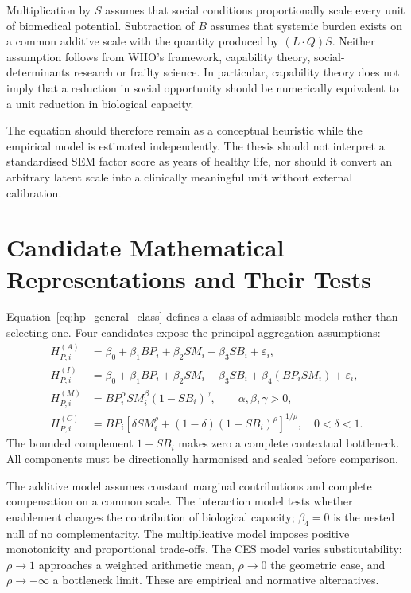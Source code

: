 Multiplication by $S$ assumes that social conditions proportionally scale every unit of biomedical potential. Subtraction of $B$ assumes that systemic burden exists on a common additive scale with the quantity produced by $(L\cdot Q)S$. Neither assumption follows from WHO's framework, capability theory, social-determinants research or frailty science. In particular, capability theory does not imply that a reduction in social opportunity should be numerically equivalent to a unit reduction in biological capacity.

The equation should therefore remain as a conceptual heuristic while the empirical model is estimated independently. The thesis should not interpret a standardised SEM factor score as years of healthy life, nor should it convert an arbitrary latent scale into a clinically meaningful unit without external calibration.

\section{Candidate Mathematical Representations and Their Tests}

Equation~\ref{eq:hp_general_class} defines a class of admissible models rather
than selecting one. Four candidates expose the principal aggregation assumptions:
\begin{align}
H_{P,i}^{(A)}&=\beta_0+\beta_1BP_i+\beta_2SM_i-\beta_3SB_i+\varepsilon_i,
\label{eq:hp_additive}\\
H_{P,i}^{(I)}&=\beta_0+\beta_1BP_i+\beta_2SM_i-\beta_3SB_i
+\beta_4(BP_iSM_i)+\varepsilon_i,
\label{eq:hp_interaction}\\
H_{P,i}^{(M)}&=BP_i^{\alpha}SM_i^{\beta}(1-SB_i)^{\gamma},
\qquad \alpha,\beta,\gamma>0,
\label{eq:hp_multiplicative}\\
H_{P,i}^{(C)}&=BP_i\left[\delta SM_i^{\rho}
+(1-\delta)(1-SB_i)^{\rho}\right]^{1/\rho},
\quad 0<\delta<1.
\label{eq:hp_ces}
\end{align}
The bounded complement $1-SB_i$ makes zero a complete contextual bottleneck.
All components must be directionally harmonised and scaled before comparison.

The additive model assumes constant marginal contributions and complete
compensation on a common scale. The interaction model tests whether enablement
changes the contribution of biological capacity; $\beta_4=0$ is the nested null
of no complementarity. The multiplicative model imposes positive monotonicity
and proportional trade-offs. The CES model varies substitutability:
$\rho\rightarrow1$ approaches a weighted arithmetic mean,
$\rho\rightarrow0$ the geometric case, and $\rho\rightarrow-\infty$ a
bottleneck limit. These are empirical and normative alternatives.

